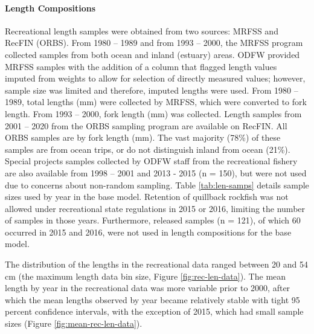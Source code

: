 \documentclass[11pt,
  english,
  a4paper,
]{article}
\begin{document}
\leavevmode\tagmcend\tagstructend\par


\hypertarget{length-compositions-1}{%
\paragraph{Length Compositions}\label{length-compositions-1}}

\leavevmode\tagmcend\tagstructend


Recreational length samples were obtained from two sources: MRFSS and RecFIN (ORBS). From 1980 -- 1989 and from 1993 -- 2000, the MRFSS program collected samples from both ocean and inland (estuary) areas. ODFW provided MRFSS samples with the addition of a column that flagged length values imputed from weights to allow for selection of directly measured values; however, sample size was limited and therefore, imputed lengths were used. From 1980 -- 1989, total lengths (mm) were collected by MRFSS, which were converted to fork length. From 1993 -- 2000, fork length (mm) was collected. Length samples from 2001 -- 2020 from the ORBS sampling program are available on RecFIN. All ORBS samples are by fork length (mm). The vast majority (78\%) of these samples are from ocean trips, or do not distinguish inland from ocean (21\%). Special projects samples collected by ODFW staff from the recreational fishery are also available from 1998 -- 2001 and 2013 - 2015 (n = 150), but were not used due to concerns about non-random sampling. Table \ref{tab:len-samps} details sample sizes used by year in the base model. Retention of quillback rockfish was not allowed under recreational state regulations in 2015 or 2016, limiting the number of samples in those years. Furthermore, released samples (n = 121), of which 60 occurred in 2015 and 2016, were not used in length compositions for the base model.

\leavevmode\tagmcend\tagstructend\par


The distribution of the lengths in the recreational data ranged between 20 and 54 cm (the maximum length data bin size, Figure \ref{fig:rec-len-data}). The mean length by year in the recreational data was more variable prior to 2000, after which the mean lengths observed by year became relatively stable with tight 95 percent confidence intervals, with the exception of 2015, which had small sample sizes (Figure \ref{fig:mean-rec-len-data}).
\end{document}
